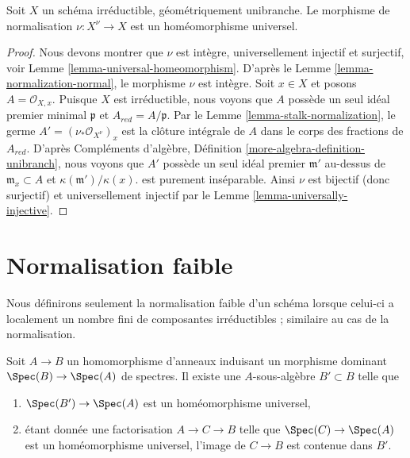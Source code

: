 \begin{lemma}
\label{lemma-normalization-geom-unibranch-univ-homeo}
Soit $X$ un schéma irréductible, géométriquement unibranche.
Le morphisme de normalisation $\nu : X^\nu \to X$ est un homéomorphisme
universel.
\end{lemma}

\begin{proof}
Nous devons montrer que $\nu$ est intègre, universellement
injectif et surjectif, voir Lemme \ref{lemma-universal-homeomorphism}. D'après
le Lemme \ref{lemma-normalization-normal}, le morphisme $\nu$ est
intègre. Soit $x \in X$ et posons $A = \mathcal{O}_{X, x}$. Puisque
$X$ est irréductible, nous voyons que
$A$ possède un seul idéal premier minimal $\mathfrak p$
et $A_{red} = A/\mathfrak p$. Par le Lemme \ref{lemma-stalk-normalization},
le germe $A' = (\nu_*\mathcal{O}_{X^\nu})_x$ est la clôture intégrale de $A$
dans le corps des fractions de
$A_{red}$. D'après Compléments d'algèbre, Définition \ref{more-algebra-definition-unibranch},
nous voyons que $A'$ possède un seul idéal
premier $\mathfrak m'$ au-dessus de $\mathfrak m_x \subset A$ et $\kappa(\mathfrak m')/\kappa(x)$.
est purement inséparable. Ainsi $\nu$ est bijectif (donc
surjectif) et universellement injectif par le Lemme \ref{lemma-universally-injective}.
\end{proof}







\section{Normalisation faible}
\label{section-weak-normalization}

\noindent
Nous définirons seulement la normalisation faible d'un schéma lorsque celui-ci
a localement un nombre fini de composantes irréductibles ; similaire
au cas de la normalisation.

\begin{lemma}
\label{lemma-relative-weak-normalization-algebra}
Soit $A \to B$ un homomorphisme d'anneaux induisant un morphisme
dominant $\Spec(B) \to \Spec(A)$ de spectres. Il existe une $A$-sous-algèbre
$B' \subset B$ telle que
\begin{enumerate}
\item $\Spec(B') \to \Spec(A)$ est un homéomorphisme universel,
\item étant donnée une factorisation $A \to C \to B$ telle que
$\Spec(C) \to \Spec(A)$ est un homéomorphisme universel, l'image de
$C \to B$ est contenue dans $B'$.
\end{enumerate}
\end{lemma}

